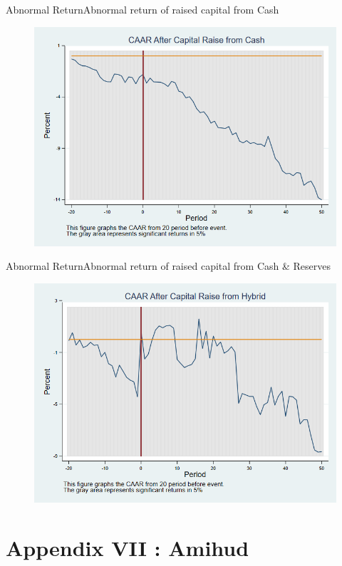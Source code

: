 \documentclass{beamer}
\begin{document}
	
	\begin{frame}{Abnormal Return}{Abnormal return of raised capital from Cash}
		\label{car_marketindustryCash}
		\begin{figure}
			\centering
			\includegraphics[width=0.65\linewidth]{Output/car_marketindustryCash}
			\label{fig:car_marketindustryCash}
		\end{figure}
	\end{frame}
	
	
	\begin{frame}{Abnormal Return}{Abnormal return of raised capital from Cash \& Reserves}
		\label{car_marketindustryHybrid}
		\begin{figure}
			\centering
			\includegraphics[width=0.65\linewidth]{Output/car_marketindustryHybrid}
			\label{fig:car_marketindustryHybrid}
		\end{figure}
	\end{frame}
	
	
	
	
	\section{Appendix VII : Amihud}
	
\end{document}
